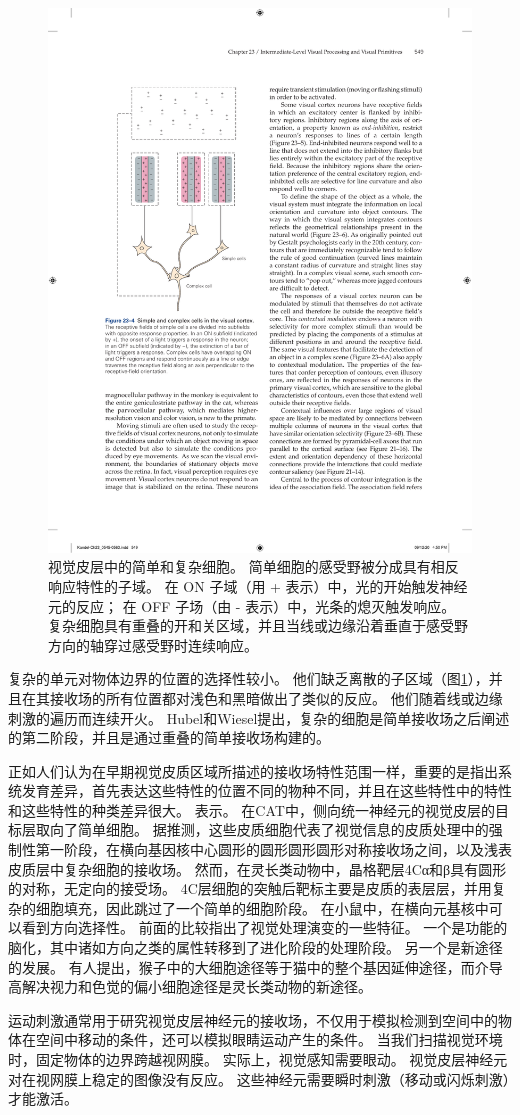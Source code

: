 \begin{figure}[htbp]
	\centering
	\includegraphics[width=0.5\linewidth]{chap23/fig_23_4}
	\caption{视觉皮层中的简单和复杂细胞。 简单细胞的感受野被分成具有相反响应特性的子域。 在 ON 子域（用 + 表示）中，光的开始触发神经元的反应； 在 OFF 子场（由 - 表示）中，光条的熄灭触发响应。 复杂细胞具有重叠的开和关区域，并且当线或边缘沿着垂直于感受野方向的轴穿过感受野时连续响应。}
	\label{fig:23_4}
\end{figure}


复杂的单元对物体边界的位置的选择性较小。 
他们缺乏离散的子区域（图\ref{fig:23_4}），并且在其接收场的所有位置都对浅色和黑暗做出了类似的反应。 
他们随着线或边缘刺激的遍历而连续开火。 
Hubel和Wiesel提出，复杂的细胞是简单接收场之后阐述的第二阶段，并且是通过重叠的简单接收场构建的。


正如人们认为在早期视觉皮质区域所描述的接收场特性范围一样，重要的是指出系统发育差异，首先表达这些特性的位置不同的物种不同，并且在这些特性中的特性和这些特性的种类差异很大。 表示。 
在CAT中，侧向统一神经元的视觉皮层的目标层取向了简单细胞。 
据推测，这些皮质细胞代表了视觉信息的皮质处理中的强制性第一阶段，在横向基因核中心圆形的圆形圆形圆形对称接收场之间，以及浅表皮质层中复杂细胞的接收场。 
然而，在灵长类动物中，晶格靶层4Cα和β具有圆形的对称，无定向的接受场。 
4C层细胞的突触后靶标主要是皮质的表层层，并用复杂的细胞填充，因此跳过了一个简单的细胞阶段。 
在小鼠中，在横向元基核中可以看到方向选择性。 
前面的比较指出了视觉处理演变的一些特征。 
一个是功能的脑化，其中诸如方向之类的属性转移到了进化阶段的处理阶段。 
另一个是新途径的发展。 
有人提出，猴子中的大细胞途径等于猫中的整个基因延伸途径，而介导高解决视力和色觉的偏小细胞途径是灵长类动物的新途径。


运动刺激通常用于研究视觉皮层神经元的接收场，不仅用于模拟检测到空间中的物体在空间中移动的条件，还可以模拟眼睛运动产生的条件。 
当我们扫描视觉环境时，固定物体的边界跨越视网膜。 
实际上，视觉感知需要眼动。 
视觉皮层神经元对在视网膜上稳定的图像没有反应。 
这些神经元需要瞬时刺激（移动或闪烁刺激）才能激活。


